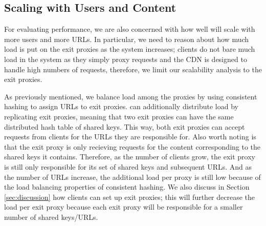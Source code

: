 
\subsection{Scaling with Users and Content}
\label{sec:scalability}

For evaluating performance, we are also concerned with how well \system{} will scale with more users 
and more URLs.  In particular, we need to reason about how much load is put on the exit proxies as the 
system increases; clients do not bare much load in the system as they simply proxy
requests and the CDN is designed
to handle high numbers of requests, therefore, we limit our scalability analysis to the exit proxies.  

As previously mentioned, we balance load among the proxies by using consistent hashing to assign URLs to 
exit proxies.  \system{} can additionally distribute load by replicating exit proxies, meaning that two exit proxies can 
have the same distributed hash table of shared keys.  This way, both exit proxies can accept requests from clients for 
the URLs they are responsible for.  Also worth noting is that the exit proxy is only recieving requests for the content 
corresponding to the shared keys it contains.  Therefore, as the number of clients grow, the exit proxy is still only responsible 
for its set of shared keys and subsequent URLs.  And as the number of URLs increase, the additional load per proxy is 
still low because of the load balancing properties of consistent hashing.  We also discuss in Section \ref{sec:discussion} how 
clients can set up exit proxies; this will further decrease the load per exit proxy because each exit proxy will be responsible 
for a smaller number of shared keys/URLs.
